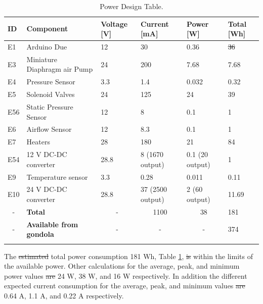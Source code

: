 \documentclass[a4paper,12pt,oneside]{article}
\providecommand{\DIFaddtex}[1]{{\protect\color{blue}\uwave{#1}}} %
\providecommand{\DIFdeltex}[1]{{\protect\color{red}\sout{#1}}}                      %
\providecommand{\DIFaddbegin}{} %
\providecommand{\DIFaddend}{} %
\providecommand{\DIFdelbegin}{} %
\providecommand{\DIFdelend}{} %
\providecommand{\DIFadd}[1]{\texorpdfstring{\DIFaddtex{#1}}{#1}} %
\providecommand{\DIFdel}[1]{\texorpdfstring{\DIFdeltex{#1}}{}} %
\newcommand{\DIFscaledelfig}{0.5}
\newlength{\DIFdelgraphicswidth} %
\newlength{\DIFdelgraphicsheight} %
\newcommand{\DIFaddincludegraphics}[2][]{{\color{blue}\fbox{\DIFOincludegraphics[#1]{#2}}}} %
\newcommand{\DIFdelincludegraphics}[2][]{%
\sbox{\DIFdelgraphicsbox}{\DIFOincludegraphics[#1]{#2}}%
\settoboxwidth{\DIFdelgraphicswidth}{\DIFdelgraphicsbox} %
\settoboxtotalheight{\DIFdelgraphicsheight}{\DIFdelgraphicsbox} %
\scalebox{\DIFscaledelfig}{%
\parbox[b]{\DIFdelgraphicswidth}{\usebox{\DIFdelgraphicsbox}\\[-\baselineskip] \rule{\DIFdelgraphicswidth}{0em}}\llap{\resizebox{\DIFdelgraphicswidth}{\DIFdelgraphicsheight}{%
\setlength{\unitlength}{\DIFdelgraphicswidth}%
\begin{picture}(1,1)%
\thicklines\linethickness{2pt} %
{\color[rgb]{1,0,0}\put(0,0){\framebox(1,1){}}}%
{\color[rgb]{1,0,0}\put(0,0){\line( 1,1){1}}}%
{\color[rgb]{1,0,0}\put(0,1){\line(1,-1){1}}}%
\end{picture}%
}\hspace*{3pt}}} %
} %
\DeclareRobustCommand{\DIFaddbegin}{\DIFOaddbegin \let\includegraphics\DIFaddincludegraphics} %
\DeclareRobustCommand{\DIFaddend}{\DIFOaddend \let\includegraphics\DIFOincludegraphics} %
\DeclareRobustCommand{\DIFdelbegin}{\DIFOdelbegin \let\includegraphics\DIFdelincludegraphics} %
\DeclareRobustCommand{\DIFdelend}{\DIFOaddend \let\includegraphics\DIFOincludegraphics} %
\begin{document}
\begin{longtable}{|m{}| m{} |m{} |m{}|m{}| m{} |}
\hline
\textbf{ID}             & \textbf{Component}                                                   & \textbf{Voltage {[}V{]}} & \textbf{Current {[}mA{]}} & \textbf{Power {[}W{]}} & \textbf{Total {[}Wh{]}} \\ \hline
E1 & Arduino Due & 12& 30  & 0.36  & \DIFdelbegin \DIFdel{36  }\DIFdelend \DIFaddbegin \DIFadd{4  }\DIFaddend \\ \hline
E3 & Miniature Diaphragm air Pump & 24 & 200 & 7.68 & 7.68 \\ \hline
E4  & Pressure Sensor  & 3.3 & 1.4 & 0.032 & 0.32  \\ \hline
E5  & Solenoid Valves & 24 & 125 & 24  & 39 \\ \hline
E56 & Static Pressure Sensor & 12  & 8   & 0.1 & 1 \\ \hline
E6 & Airflow Sensor & 12  & 8.3   & 0.1 & 1 \\ \hline

E7   &  Heaters & 28 & 180  & 21 & 84 \\ \hline
E54  & 12 V DC-DC converter  & 28.8   & 8 (1670 output) & 0.1 (20 output) & 1 \\ \hline
E9  & Temperature sensor & 3.3 & 0.28 & 0.011  & 0.11   \\ \hline




E10  & 24 V DC-DC converter   & 28.8   & 37 (2500 output) & 2 (60 output) & 11.69 \\ \hline
\multicolumn{1}{|c|}{-} & \textbf{Total}                                  & \multicolumn{1}{c|}{-}                      & \multicolumn{1}{c|}{1100}                    & \multicolumn{1}{c|}{38}                 & 181                                        \\ \hline
\multicolumn{1}{|c|}{-} & \textbf{Available from gondola}                 & \multicolumn{1}{c|}{-}                      & \multicolumn{1}{c|}{-}                       & \multicolumn{1}{c|}{-}                    & 374                                        \\ \hline

\caption{Power Design Table.}
\label{tab:power-design-table}
\end{longtable}
\raggedbottom



The \DIFdelbegin \DIFdel{estimated }\DIFdelend total power consumption 181 Wh, Table \ref{tab:power-design-table}, \DIFdelbegin \DIFdel{is }\DIFdelend \DIFaddbegin \DIFadd{was }\DIFaddend within the limits of the available power. Other calculations for the average, peak, and minimum power values \DIFdelbegin \DIFdel{are }\DIFdelend \DIFaddbegin \DIFadd{were }\DIFaddend 24 W, 38 W, and 16 W respectively. In addition the different expected current consumption for the average, peak, and minimum values \DIFdelbegin \DIFdel{are }\DIFdelend \DIFaddbegin \DIFadd{were }\DIFaddend 0.64 A, 1.1 A, and 0.22 A respectively.
\end{document}
